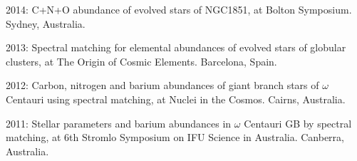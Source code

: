 \item[{\color{numcolor}\scriptsize4}] 2014: C+N+O abundance of evolved stars of NGC1851, at  Bolton Symposium. Sydney, Australia.
\item[{\color{numcolor}\scriptsize3}] 2013: Spectral matching for elemental abundances of evolved stars of globular clusters, at The Origin of Cosmic Elements. Barcelona, Spain.
\item[{\color{numcolor}\scriptsize2}] 2012: Carbon, nitrogen and barium abundances of giant branch stars of $\omega$ Centauri using spectral matching, at Nuclei in the Cosmos. Cairns, Australia.
\item[{\color{numcolor}\scriptsize1}] 2011: Stellar parameters and barium abundances in $\omega$ Centauri GB by spectral matching, at  6th Stromlo Symposium on IFU Science in Australia. Canberra, Australia.
